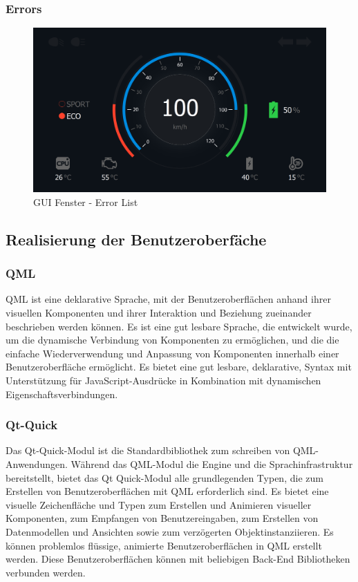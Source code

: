 \subsubsection{Errors}

\begin{figure}[H]
	\begin{center}
		\includegraphics[scale=0.24]{figures/hcis/window_dashboard.png}
			\caption{GUI Fenster - Error List}
			\label{fig:pageError}
	\end{center}
\end{figure}

\newpage

\subsection{Realisierung der Benutzeroberfäche}

\subsubsection{QML}
QML ist eine deklarative Sprache, mit der Benutzeroberflächen anhand ihrer visuellen Komponenten und ihrer Interaktion und Beziehung zueinander beschrieben werden können. Es ist eine gut lesbare Sprache, die entwickelt wurde, um die dynamische Verbindung von Komponenten zu ermöglichen, und die die einfache Wiederverwendung und Anpassung von Komponenten innerhalb einer Benutzeroberfläche ermöglicht. Es bietet eine gut lesbare, deklarative, Syntax mit Unterstützung für JavaScript-Ausdrücke in Kombination mit dynamischen Eigenschaftsverbindungen.

\subsubsection{Qt-Quick}
Das Qt-Quick-Modul ist die Standardbibliothek zum schreiben von QML-Anwendungen. Während das QML-Modul die Engine und die Sprachinfrastruktur bereitstellt, bietet das Qt Quick-Modul alle grundlegenden Typen, die zum Erstellen von Benutzeroberflächen mit QML erforderlich sind. Es bietet eine visuelle Zeichenfläche und Typen zum Erstellen und Animieren visueller Komponenten, zum Empfangen von Benutzereingaben, zum Erstellen von Datenmodellen und Ansichten sowie zum verzögerten Objektinstanziieren. Es können problemlos flüssige, animierte Benutzeroberflächen in QML erstellt werden. Diese Benutzeroberflächen können mit beliebigen Back-End Bibliotheken verbunden werden.


